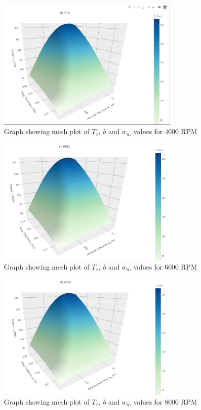 \documentclass[lettersize,journal]{IEEEtran}
\begin{document}
\begin{figure}[!htbp]
\centering
\includegraphics[width=3.5in]{images/mTC4k.png}
\caption{Graph showing mesh plot of $T_e,\ b$ and $w_m$ values for 4000 RPM}
\label{fig5}
\end{figure}
\FloatBarrier

\begin{figure}[!htbp]
\centering
\includegraphics[width=3.5in]{images/mTC6k.png}
\caption{Graph showing mesh plot of $T_e,\ b$ and $w_m$ values for 6000 RPM}
\label{fig6}
\end{figure}
\FloatBarrier

\begin{figure}[!htbp]
\centering
\includegraphics[width=3.5in]{images/mTC8k.png}
\caption{Graph showing mesh plot of $T_e,\ b$ and $w_m$ values for 8000 RPM}
\label{fig7}
\end{figure}
\FloatBarrier
\end{document}
